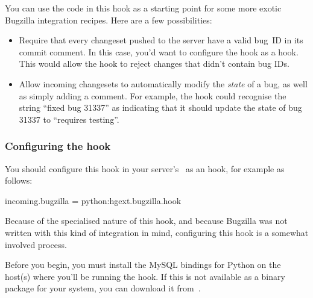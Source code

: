 You can use the code in this hook as a starting point for some more
exotic Bugzilla integration recipes.  Here are a few possibilities:
\begin{itemize}
\item Require that every changeset pushed to the server have a valid
  bug~ID in its commit comment.  In this case, you'd want to configure
  the hook as a  hook.  This would allow the hook
  to reject changes that didn't contain bug IDs.
\item Allow incoming changesets to automatically modify the
  \emph{state} of a bug, as well as simply adding a comment.  For
  example, the hook could recognise the string ``fixed bug 31337'' as
  indicating that it should update the state of bug 31337 to
  ``requires testing''.
\end{itemize}

\subsubsection{Configuring the  hook}
\label{sec:hook:bugzilla:config}

You should configure this hook in your server's \hgrc\ as an
 hook, for example as follows:
\begin{codesample2}
  [hooks]
  incoming.bugzilla = python:hgext.bugzilla.hook
\end{codesample2}

Because of the specialised nature of this hook, and because Bugzilla
was not written with this kind of integration in mind, configuring
this hook is a somewhat involved process.

Before you begin, you must install the MySQL bindings for Python on
the host(s) where you'll be running the hook.  If this is not
available as a binary package for your system, you can download it
from~\cite{web:mysql-python}.

